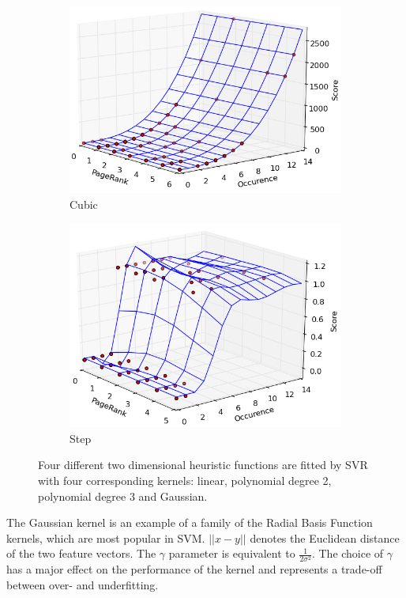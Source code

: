 \documentclass[12pt,a4paper,notitlepage,twoside]{scrbook}
\begin{document}
\begin{figure}[b!]
\begin{subfigure}[b]{.49\textwidth}
  \centering
  \includegraphics[width=1\linewidth]{figs/cub.png}
  \caption{Cubic}
  \label{cubic}
\end{subfigure}
\begin{subfigure}[b]{.49\textwidth}
  \centering
  \includegraphics[width=1\linewidth]{figs/step.png}
  \caption{Step}
  \label{step}
\end{subfigure}
\caption{Four different two dimensional heuristic functions are fitted by SVR with four
	corresponding kernels: linear, polynomial degree 2, polynomial degree 3 and Gaussian.\label{kernels}}
\end{figure}

The Gaussian kernel is an example of a family of the Radial Basis Function kernels, which
are
most popular in SVM. \(||x-y||\) denotes the
Euclidean distance of the two feature vectors. The \(\gamma\) parameter is
equivalent to \(\frac{1}{2\sigma^2}\). The choice of \(\gamma\) has a major
effect on the performance of the kernel and represents a trade-off between over-
and underfitting. 
\end{document}
